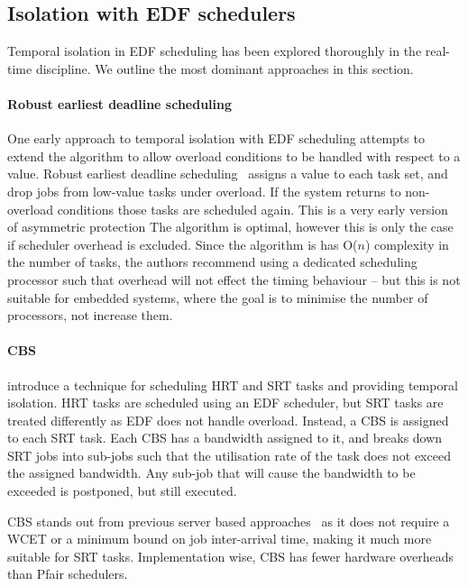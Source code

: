 \subsection{Isolation with EDF schedulers}

Temporal isolation in \gls{EDF} scheduling has been explored thoroughly in the real-time discipline.
We outline the most dominant approaches in this section.

\paragraph{Robust earliest deadline scheduling}
One early approach to temporal isolation with \gls{EDF} scheduling attempts to extend the 
algorithm to allow overload conditions to be handled with respect to a value. Robust earliest deadline
scheduling~\citep{Buttazzo_Stankovic_93} assigns a value to each task set, and drop jobs from
low-value tasks under overload. If the system returns to non-overload conditions those tasks are
scheduled again. This is a very early version of asymmetric protection
The algorithm is optimal, however this is only the case if
scheduler overhead is excluded.  Since the algorithm is has O($n$) complexity in the number of
tasks, the authors recommend using a dedicated scheduling processor such that overhead will not
effect the timing behaviour -- but this is not suitable for embedded systems, where the goal is to
minimise the number of processors, not increase them.

\paragraph{\Gls{CBS}} \citet{Abeni_Buttazzo_04} introduce a technique for scheduling \gls{HRT} and
\gls{SRT} tasks and providing temporal isolation.  \gls{HRT} tasks are scheduled using an \gls{EDF}
scheduler, but \gls{SRT} tasks are treated differently as \gls{EDF} does not handle overload.
Instead, a \gls{CBS} is assigned to each \gls{SRT} task.  Each \gls{CBS} has a bandwidth assigned to
it, and breaks down \gls{SRT} jobs into sub-jobs such that the utilisation rate of the task does not
exceed the assigned bandwidth.  Any sub-job that will cause the bandwidth to be exceeded is
postponed, but still executed.

\gls{CBS} stands out from previous server based approaches~\citep{Spuri_Buttazzo_96,
Ghazalie_Baker_95, Spuri_Buttazzo_94, Deng_Liu_97} as it does not require a \gls{WCET} or a minimum
bound on job inter-arrival time, making it much more suitable for \gls{SRT} tasks.  Implementation
wise, \gls{CBS} has fewer hardware overheads than Pfair schedulers.

